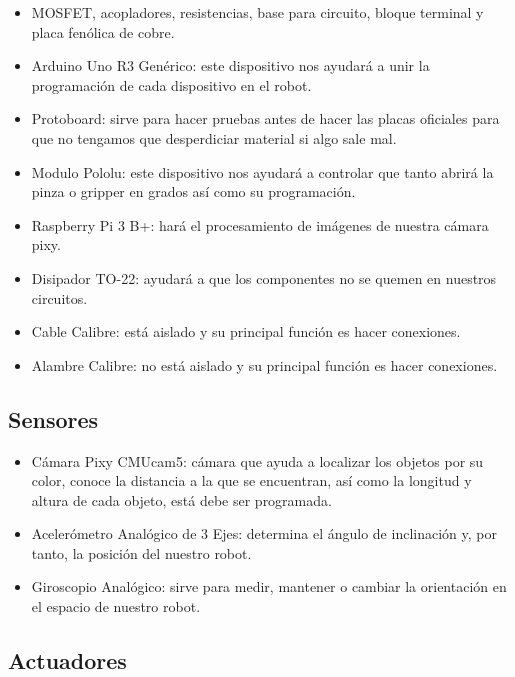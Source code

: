 \documentclass{article}
\begin{document}
\begin{itemize}
    \item MOSFET, acopladores, resistencias, base para circuito, bloque terminal y placa fenólica de cobre.
    \item Arduino Uno R3 Genérico: este dispositivo nos ayudará a unir la programación de cada dispositivo en el robot.
    \item Protoboard: sirve para hacer pruebas antes de hacer las placas oficiales para que no tengamos que desperdiciar material si algo sale mal.
    \item Modulo Pololu: este dispositivo nos ayudará a controlar que tanto abrirá la pinza o gripper en grados así como su programación.
    \item Raspberry Pi 3 B+: hará el procesamiento de imágenes de nuestra cámara pixy.
    \item Disipador TO-22: ayudará a que los componentes no se quemen en nuestros circuitos.
    \item Cable Calibre: está aislado y su principal función es hacer conexiones.
    \item Alambre Calibre: no está aislado y su principal función es hacer conexiones.
\end{itemize}

\subsection{Sensores}

\begin{itemize}
    \item Cámara Pixy CMUcam5: cámara que ayuda a localizar los objetos por su color, conoce la distancia a la que se encuentran, así como la longitud y altura de cada objeto, está debe ser programada.
    \item Acelerómetro Analógico de 3 Ejes: determina el ángulo de inclinación y, por tanto, la posición del nuestro robot.
    \item Giroscopio Analógico: sirve para medir, mantener o cambiar la orientación en el espacio de nuestro robot.
\end{itemize}

\subsection{Actuadores}
\end{document}
